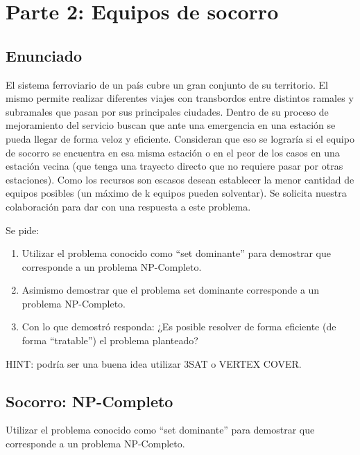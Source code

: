\documentclass[titlepage,a4paper]{article}
\begin{document}





\setcounter{section}{1}%
\renewcommand{\thesection}{P\arabic{section}}%

\newpage\section{Parte 2: Equipos de socorro}\label{sec:parte2}

\setcounter{subsection}{0}%
\renewcommand{\thesubsection}{\alph{subsection}}%

\subsection{Enunciado}
El sistema ferroviario de un país cubre un gran conjunto de su territorio. El mismo permite realizar diferentes viajes con transbordos entre distintos ramales y subramales que pasan por sus principales ciudades. Dentro de su proceso de mejoramiento del servicio buscan que ante una emergencia en una estación se pueda llegar de forma veloz y eficiente. Consideran que eso se lograría si el equipo de socorro se encuentra en esa misma estación o en el peor de los casos en una estación vecina (que tenga una trayecto directo que no requiere pasar por otras estaciones). Como los recursos son escasos desean establecer la menor cantidad de equipos posibles (un máximo de k equipos pueden solventar). Se solicita nuestra colaboración para dar con una respuesta a este problema.

\noindent Se pide:
\begin{enumerate}
    \item Utilizar el problema conocido como “set dominante” para demostrar que corresponde a un problema NP-Completo.
    \item Asimismo demostrar que el problema set dominante corresponde a un problema NP-Completo.
    \item Con lo que demostró responda: ¿Es posible resolver de forma eficiente (de forma “tratable”) el problema planteado?
\end{enumerate}

HINT: podría ser una buena idea utilizar 3SAT o VERTEX COVER.


\setcounter{subsection}{0}%
\renewcommand{\thesubsection}{\arabic{subsection}}%

\newpage\subsection{Socorro: NP-Completo}\label{sec:parte2_1}
\begin{tcolorbox}[colback=blue!5!white,colframe=blue!75!black,title=Enunciado P2.1]
    Utilizar el problema conocido como “set dominante” para demostrar
    que corresponde a un problema NP-Completo.
\end{tcolorbox}
\end{document}
